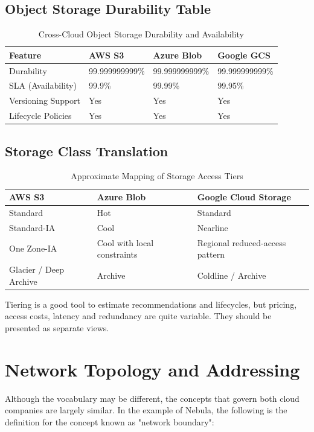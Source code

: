\subsection{Object Storage Durability Table}
\begin{table}[H]
\centering
\caption{Cross-Cloud Object Storage Durability and Availability}
\label{tab:storage_sla}
\begin{tabular}{|l|l|l|l|}
\hline
\textbf{Feature} & \textbf{AWS S3} & \textbf{Azure Blob} & \textbf{Google GCS} \\ \hline
Durability & 99.999999999\% & 99.999999999\% & 99.999999999\% \\ \hline
SLA (Availability) & 99.9\% & 99.99\% & 99.95\% \\ \hline
Versioning Support & Yes & Yes & Yes \\ \hline
Lifecycle Policies & Yes & Yes & Yes \\ \hline
\end{tabular}
\end{table}

\subsection{Storage Class Translation}
\begin{table}[H]
\centering
\caption{Approximate Mapping of Storage Access Tiers}
\label{tab:storage_class_map}
\begin{tabular}{|l|l|l|}
\hline
\textbf{AWS S3} & \textbf{Azure Blob} & \textbf{Google Cloud Storage} \\ \hline
Standard & Hot & Standard \\ \hline
Standard-IA & Cool & Nearline \\ \hline
One Zone-IA & Cool with local constraints & Regional reduced-access pattern \\ \hline
Glacier / Deep Archive & Archive & Coldline / Archive \\ \hline
\end{tabular}
\end{table}

Tiering is a good tool to estimate recommendations and lifecycles, but pricing, access costs, latency and redundancy are quite variable. They should be presented as separate views.

\section{Network Topology and Addressing}
Although the vocabulary may be different, the concepts that govern both cloud companies are largely similar. In the example of Nebula, the following is the definition for the concept known as "network boundary":

